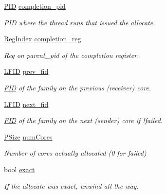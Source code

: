 \begin{DoxyCompactItemize}
\item 
\hyperlink{namespace_simulator_aa671021151c047ae2da6dce4e6303476}{P\+I\+D} \hyperlink{struct_simulator_1_1drisc_1_1_alloc_response_ac071b34bcd711f8819bba0d9d01a5cad}{completion\+\_\+pid}
\begin{DoxyCompactList}\small\item\em P\+I\+D where the thread runs that issued the allocate. \end{DoxyCompactList}\item 
\hyperlink{namespace_simulator_ab00c9033de4c9a17db7b53d6c292515c}{Reg\+Index} \hyperlink{struct_simulator_1_1drisc_1_1_alloc_response_a93fbecda50acbeb731af9b81bbbc82bb}{completion\+\_\+reg}
\begin{DoxyCompactList}\small\item\em Reg on parent\+\_\+pid of the completion register. \end{DoxyCompactList}\item 
\hyperlink{namespace_simulator_aaccbc706b2d6c99085f52f6dfc2333e4}{L\+F\+I\+D} \hyperlink{struct_simulator_1_1drisc_1_1_alloc_response_a75a1c47e8373c49d9b6b50f8ea683dee}{prev\+\_\+fid}
\begin{DoxyCompactList}\small\item\em \hyperlink{struct_simulator_1_1_f_i_d}{F\+I\+D} of the family on the previous (receiver) core. \end{DoxyCompactList}\item 
\hyperlink{namespace_simulator_aaccbc706b2d6c99085f52f6dfc2333e4}{L\+F\+I\+D} \hyperlink{struct_simulator_1_1drisc_1_1_alloc_response_a0f4a4d54a9d59adb1bebd90b8b2fab8e}{next\+\_\+fid}
\begin{DoxyCompactList}\small\item\em \hyperlink{struct_simulator_1_1_f_i_d}{F\+I\+D} of the family on the next (sender) core if !failed. \end{DoxyCompactList}\item 
\hyperlink{namespace_simulator_a4aa07bee2f34beac11abf48a8ccc47c4}{P\+Size} \hyperlink{struct_simulator_1_1drisc_1_1_alloc_response_a4e5ebf0f9fa1e8c87270468ab10eba8e}{num\+Cores}
\begin{DoxyCompactList}\small\item\em Number of cores actually allocated (0 for failed) \end{DoxyCompactList}\item 
bool \hyperlink{struct_simulator_1_1drisc_1_1_alloc_response_a83d3c98ad20acd712266852db84b5918}{exact}
\begin{DoxyCompactList}\small\item\em If the allocate was exact, unwind all the way. \end{DoxyCompactList}\end{DoxyCompactItemize}


